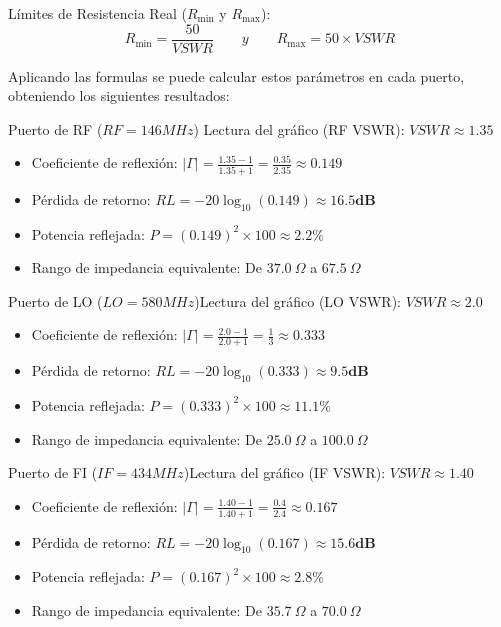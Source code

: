 \documentclass[11pt,a4paper,twoside]{report}
\begin{document}
	Límites de Resistencia Real ($R_{\min}$ y $R_{\max}$):
	\begin{equation}
		R_{\min} = \frac{50}{VSWR} \qquad y \qquad R_{\max} = 50 \times VSWR
	\end{equation}\newline
	
	Aplicando las formulas se puede calcular estos parámetros en cada puerto, obteniendo los siguientes resultados:
	
	Puerto de RF ($RF = 146MHz$) Lectura del gráfico (RF VSWR): $VSWR \approx 1.35$
	\begin{itemize}
		\item Coeficiente de reflexión: $\vert{}\Gamma\vert{} = \frac{1.35 - 1}{1.35 + 1} = \frac{0.35}{2.35} \approx \mathbf{0.149}$
		\item Pérdida de retorno: $RL = -20 \log_{10}(0.149) \approx \mathbf{16.5dB}$
		\item Potencia reflejada: $P = (0.149)^2 \times 100 \approx \mathbf{2.2\%}$
		\item Rango de impedancia equivalente: De $37.0\ \Omega$ a $67.5\ \Omega$
	\end{itemize}
	
	Puerto de LO ($LO= 580MHz$)Lectura del gráfico (LO VSWR): $VSWR \approx 2.0$
	\begin{itemize}
		\item Coeficiente de reflexión: $\vert{}\Gamma\vert{} = \frac{2.0 - 1}{2.0 + 1} = \frac{1}{3} \approx \mathbf{0.333}$
		\item Pérdida de retorno: $RL = -20 \log_{10}(0.333) \approx \mathbf{9.5dB}$
		\item Potencia reflejada: $P = (0.333)^2 \times 100 \approx \mathbf{11.1\%}$
		\item Rango de impedancia equivalente: De $25.0\ \Omega$ a $100.0\ \Omega$
	\end{itemize}
	
	Puerto de FI ($IF = 434MHz$)Lectura del gráfico (IF VSWR): $VSWR \approx 1.40$
	\begin{itemize}
		\item Coeficiente de reflexión: $\vert{}\Gamma\vert{} = \frac{1.40 - 1}{1.40 + 1} = \frac{0.4}{2.4} \approx \mathbf{0.167}$
		\item Pérdida de retorno: $RL = -20 \log_{10}(0.167) \approx \mathbf{15.6dB}$
		\item Potencia reflejada: $P = (0.167)^2 \times 100 \approx \mathbf{2.8\%}$
		\item Rango de impedancia equivalente: De $35.7\ \Omega$ a $70.0\ \Omega$
	\end{itemize}
	
\end{document}
